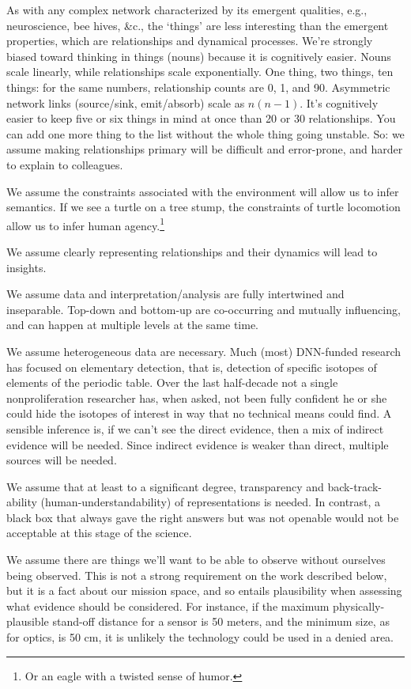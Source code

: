 \documentclass{article} %
\begin{document}
As with any complex network characterized by its emergent qualities, e.g., neuroscience, bee hives, \&c., the `things' are less interesting than the emergent properties, which are relationships and dynamical processes. We're strongly biased toward thinking in things (nouns) because it is cognitively easier. Nouns scale linearly, while relationships scale exponentially. One thing, two things, ten things: for the same numbers, relationship counts are 0, 1, and 90. Asymmetric network links (source/sink, emit/absorb) scale as $n(n-1)$. It's cognitively easier to keep five or six things in mind at once than 20 or 30 relationships. You can add one more thing to the list without the whole thing going unstable. So: we assume making relationships  primary will be difficult and error-prone, and harder to explain to colleagues.

We assume the constraints associated with the environment will allow us to infer semantics. If we see a turtle on a tree stump, the constraints of turtle locomotion allow us to infer human agency.\footnote{Or an eagle with a twisted sense of humor.}

We assume clearly representing relationships and their dynamics will lead to insights.

We assume data and interpretation/analysis are fully intertwined and inseparable. Top-down and bottom-up are co-occurring and mutually influencing, and can happen at multiple levels at the same time.

We assume heterogeneous data are necessary. Much (most) DNN-funded research has focused on elementary detection, that is, detection of specific isotopes of elements of the periodic table. Over the last half-decade not a single nonproliferation researcher has, when asked, not been fully confident he or she could hide the isotopes of interest in way that no technical means could find. A sensible inference is, if we can't see the direct evidence, then a mix of indirect evidence will be needed. Since indirect evidence is weaker than direct, multiple sources will be needed.

We assume that at least to a significant degree, transparency and back-track-ability (human-understandability) of representations is needed. In contrast, a black box that always gave the right answers but was not openable would not be acceptable at this stage of the science.

We assume there are things we'll want to be able to observe without ourselves being observed. This is not a strong requirement on the work described below, but it is a fact about our mission space, and so entails plausibility when assessing what evidence should be considered. For instance, if the maximum physically-plausible stand-off distance for a sensor is 50 meters, and the minimum size, as for optics, is 50 cm, it is unlikely the technology could be used in a denied area. 
\end{document}
